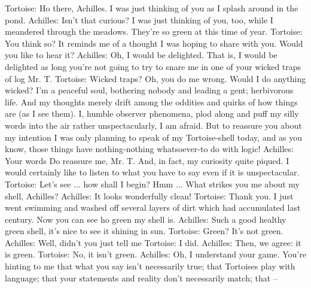 Tortoise: Ho there, Achilles. I was just thinking of you as I splash around in the pond.
Achilles: Isn't that curious? I was just thinking of you, too, while I meandered through the
       meadows. They're so green at this time of year.
Tortoise: You think so? It reminds me of a thought I was hoping to share with you.
       Would you like to hear it?
Achilles: Oh, I would be delighted. That is, I would be delighted as long you're not going
       to try to snare me in one of your wicked traps of log Mr. T.
Tortoise: Wicked traps? Oh, you do me wrong. Would I do anything wicked? I'm a
       peaceful soul, bothering nobody and leading a gent; herbivorous life. And my
       thoughts merely drift among the oddities and quirks of how things are (as I see
       them). I, humble observer phenomena, plod along and puff my silly words into
       the air rather unspectacularly, I am afraid. But to reassure you about my intention
       I was only planning to speak of my Tortoise-shell today, and as you know, those
       things have nothing-nothing whatsoever-to do with logic!
Achilles: Your words Do reassure me, Mr. T. And, in fact, my curiosity quite piqued. I
       would certainly like to listen to what you have to say even if it is unspectacular.
Tortoise: Let's see ... how shall I begin? Hmm ... What strikes you me about my shell,
       Achilles?
Achilles: It looks wonderfully clean!
Tortoise: Thank you. I just went swimming and washed off several layers of dirt which
       had accumulated last century. Now you can see ho green my shell is.
Achilles: Such a good healthy green shell, it's nice to see it shining in sun.
Tortoise: Green? It's not green.
Achilles: Well, didn't you just tell me Tortoise: I did.
Achilles: Then, we agree: it is green. Tortoise: No, it isn't green.
Achilles: Oh, I understand your game. You're hinting to me that what you say isn't
       necessarily true; that Tortoises play with language; that your statements and
       reality don't necessarily match; that --

